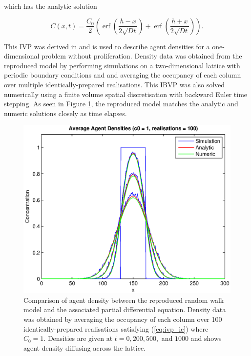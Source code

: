 \documentclass[11pt,a4paper]{article}
\DeclareMathOperator\erf{erf}
\begin{document}
		which has the analytic solution
		
		\begin{equation}
			C(x,t) = \frac{C_0}{2} \left(\erf\left(\frac{h - x}{2 \sqrt{Dt}} \right) + \erf\left(\frac{h + x}{2 \sqrt{Dt}} \right)\right).
			\label{eq:analytic_con_prolif}
		\end{equation}
		
		This IVP was derived in \cite{simpson2009diffusing} and is used to describe agent densities for a one-dimensional problem without proliferation. Density data was obtained from the reproduced model by performing simulations on a two-dimensional lattice with periodic boundary conditions and and averaging the occupancy of each column over multiple identically-prepared realisations. This IBVP was also solved numerically using a finite volume spatial discretisation with backward Euler time stepping. As seen in Figure \ref{fig:cell_concentration_1_100}, the reproduced model matches the analytic and numeric solutions closely as time elapses.

		\begin{figure}[tbh]
			\centering
				\includegraphics[width=\textwidth]{./Figures/cell_concentration_1_100.eps}
			\caption{Comparison of agent density between the reproduced random walk model and the associated partial differential equation. Density data was obtained by averaging the occupancy of each column over 100 identically-prepared realisations satisfying (\ref{eq:ivp_ic}) where $C_0 = 1$. Densities are given at $t = 0, 200, 500,$ and $1000$ and shows agent density diffusing across the lattice.}
			\label{fig:cell_concentration_1_100}
		\end{figure}
\end{document}
